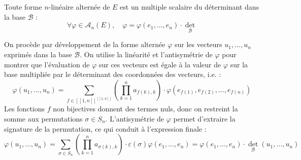 \documentclass[11pt, a4paper]{article}
\theoremstyle{definition}
\begin{document}
\clearpage

\begin{tcolorbox}[instructionstyle]
	Toute forme $n$-linéaire alternée de $E$ est un multiple scalaire du déterminant dans la base $\mathcal{B}$ :
    $$\forall \varphi \in \mathscr A_n(E), \quad \varphi = \varphi(e_1, \dots, e_n) \cdot \det_{\mathcal{B}}$$
\end{tcolorbox}

\begin{tcolorbox}[methodstyle]
	On procède par développement de la forme alternée $\varphi$ sur les vecteurs $u_1, \dots, u_n$ exprimés dans la base $\mathcal{B}$. On utilise la linéarité et l'antisymétrie de $\varphi$ pour montrer que l'évaluation de $\varphi$ sur ces vecteurs est égale à la valeur de $\varphi$ sur la base multipliée par le déterminant des coordonnées des vecteurs, i.e. :
	\[
	\varphi(u_1, \dots, u_n) = \sum_{f \in [\![1,n]\!]^{[\![1,n]\!]}} \left(\prod_{k=1}^n a_{f(k),k}\right) \cdot \varphi(e_{f(1)}, e_{f(2)}, \dots, e_{f(n)})
	\]
	Les fonctions $f$ non bijectives donnent des termes nuls, donc on restreint la somme aux permutations $\sigma \in S_n$. L'antisymétrie de $\varphi$ permet d'extraire la signature de la permutation, ce qui conduit à l'expression finale :
	\[
	\varphi(u_1, \dots, u_n) = \sum_{\sigma \in S_n} \left(\prod_{k=1}^n a_{\sigma(k),k}\right) \cdot \varepsilon(\sigma) \varphi(e_1, \dots, e_n) = \varphi(e_1, \dots, e_n) \cdot \det_{\mathcal{B}}(u_1, \dots, u_n)
	\]
\end{tcolorbox}
\end{document}
